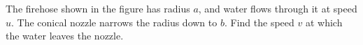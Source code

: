 The firehose shown in the figure has radius $a$, and water flows through it
at speed $u$. The conical nozzle narrows the radius down to $b$. Find the
speed $v$ at which the water leaves the nozzle.\answercheck
